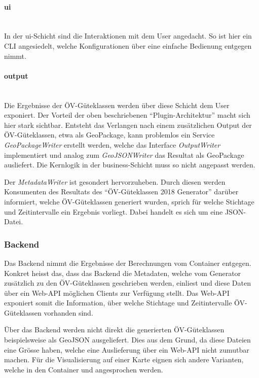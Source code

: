 \paragraph{ui}~\\
\label{layer:ui}
In der ui-Schicht sind die Interaktionen mit dem User angedacht.
So ist hier ein \ac{CLI} angesiedelt, welche Konfigurationen über eine einfache Bedienung entgegen nimmt.

\paragraph{output}~\\
\label{layer:output}
Die Ergebnisse der \gls{ÖV-Güteklassen} werden über diese Schicht dem User exponiert.
Der Vorteil der oben beschriebenen "`Plugin-Architektur"' macht sich hier stark sichtbar.
Entsteht das Verlangen nach einem zusätzlichen Output der \gls{ÖV-Güteklassen}, etwa als GeoPackage, kann problemlos ein Service \emph{GeoPackageWriter} erstellt werden, welche das Interface \emph{OutputWriter} implementiert und analog zum \emph{GeoJSONWriter} das Resultat als GeoPackage ausliefert.
Die Kernlogik in der business-Schicht muss so nicht angepasst werden.

Der \emph{MetadataWriter} ist gesondert hervorzuheben.
Durch diesen werden Konsumenten des Resultats des "`\gls{ÖV-Güteklassen} 2018 Generator"' darüber informiert, welche \gls{ÖV-Güteklassen} generiert wurden, sprich für welche Stichtage und Zeitintervalle ein Ergebnis vorliegt.
Dabei handelt es sich um eine JSON-Datei.

\subsubsection{Backend}
\label{container:Backend}

Das Backend nimmt die Ergebnisse der Berechnungen vom Container  entgegen.
Konkret heisst das, dass das Backend die Metadaten, welche vom Generator zusätzlich zu den \gls{ÖV-Güteklassen} geschrieben werden, einliest und diese Daten über ein Web-\acs{API} möglichen Clients zur Verfügung stellt.
Das Web-\acs{API} exponiert somit die Information, über welche Stichtage und Zeitintervalle \gls{ÖV-Güteklassen} vorhanden sind.

Über das Backend werden nicht direkt die generierten \gls{ÖV-Güteklassen} beispielsweise als \gls{GeoJSON} ausgeliefert.
Dies aus dem Grund, da diese Dateien eine Grösse haben, welche eine Auslieferung über ein Web-\ac{API} nicht zumutbar machen.
Für die Visualisierung auf einer Karte eignen sich andere Varianten, welche in den Container  und  angesprochen werden.

